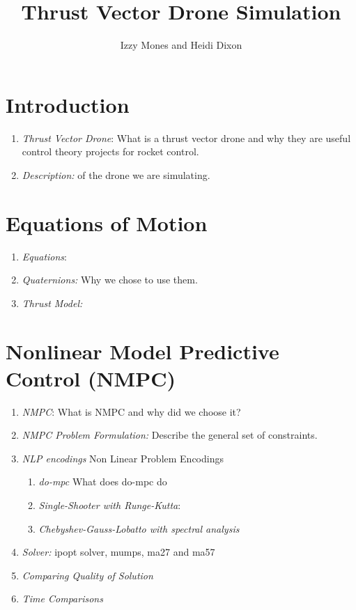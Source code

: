 \documentclass[]{article}
\title{Thrust Vector Drone Simulation}
\author{Izzy Mones and Heidi Dixon}
\begin{document}
	\maketitle
	
	\section*{Introduction}	
	\begin{enumerate}
		\item {\em Thrust Vector Drone}: What is a thrust vector drone and why they are useful control theory projects for rocket control.
		\item {\em Description:} of the drone we are simulating.
	\end{enumerate}
	
	\section*{Equations of Motion}
	\begin{enumerate}
	\item {\em Equations}:
	\item {\em Quaternions:} Why we chose to use them.
	\item {\em Thrust Model:}
	\end{enumerate}
	
	\section*{Nonlinear Model Predictive Control (NMPC)}
	
	\begin{enumerate}
	\item {\em NMPC}: What is NMPC and why did we choose it?
	\item {\em NMPC Problem Formulation:} Describe the general set of constraints. 
	\item {\em NLP encodings} Non Linear Problem Encodings
	\begin{enumerate}
		\item {\em do-mpc } What does do-mpc do
		\item {\em Single-Shooter with Runge-Kutta}: 
		\item {\em Chebyshev-Gauss-Lobatto with spectral analysis}
	\end{enumerate}
	
	\item {\em Solver:} ipopt solver, mumps, ma27 and ma57
	\item {\em Comparing Quality of Solution}  
	\item {\em Time Comparisons} 
	\end{enumerate}
	
\end{document}
